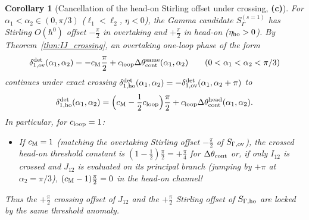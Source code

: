 \documentclass[11pt,a4paper]{article}
\newcommand{\Lc}{\textsf{\textbf{(c)}}}
\newtheorem{corollary}[proposition]{Corollary}
\theoremstyle{remark}
\begin{document}
\begin{corollary}[Cancellation of the head-on Stirling offset under crossing, \Lc]\label{cor:maslov_cancel}
For $\alpha_1<\alpha_2\in(0,\pi/3)$ ($\ell_1<\ell_2$, $\eta<0$), the Gamma candidate $S_{\Gamma}^{(s=1)}$ has Stirling $O(\hbar^0)$ offset $-\frac\pi2$ in overtaking and $+\frac\pi2$ in head-on ($\eta_{\rm ho}>0$). By Theorem~\ref{thm:IJ_crossing}, an overtaking one-loop phase of the form
\begin{equation}\label{eq:delta1_det_ov}
\delta_{1,\rm ov}^{\rm det}(\alpha_1,\alpha_2)=-c_{\rm M}\frac\pi2+c_{\rm loop}\Delta\theta_{\rm cont}^{\rm same}(\alpha_1,\alpha_2)\qquad(0<\alpha_1<\alpha_2<\pi/3)
\end{equation}
continues under exact crossing $\delta_{1,\rm ho}^{\rm det}(\alpha_1,\alpha_2)=-\delta_{1,\rm ov}^{\rm det}(\alpha_1,\alpha_2+\pi)$ to
\begin{equation}\label{eq:delta1_det_ho}
\delta_{1,\rm ho}^{\rm det}(\alpha_1,\alpha_2)=\Bigl(c_{\rm M}-\frac12 c_{\rm loop}\Bigr)\frac\pi2+c_{\rm loop}\Delta\theta_{\rm cont}^{\rm head}(\alpha_1,\alpha_2).
\end{equation}
In particular, for $c_{\rm loop}=1$:
\begin{itemize}
\item If $c_{\rm M}=1$ (matching the overtaking Stirling offset $-\frac\pi2$ of $S_{\Gamma,\rm ov}$), the crossed head-on threshold constant is $(1-\frac12)\frac\pi2=+\frac\pi4$ for $\Delta\theta_{\rm cont}$ or, if only $I_{12}$ is crossed and $J_{12}$ is evaluated on its principal branch (jumping by $+\pi$ at $\alpha_2=\pi/3$), $(c_{\rm M}-1)\frac\pi2=0$ in the head-on channel!
\end{itemize}
Thus the $+\frac\pi2$ crossing offset of $J_{12}$ and the $+\frac\pi2$ Stirling offset of $S_{\Gamma,\rm ho}$ are locked by the same threshold anomaly.
\end{corollary}
\end{document}
